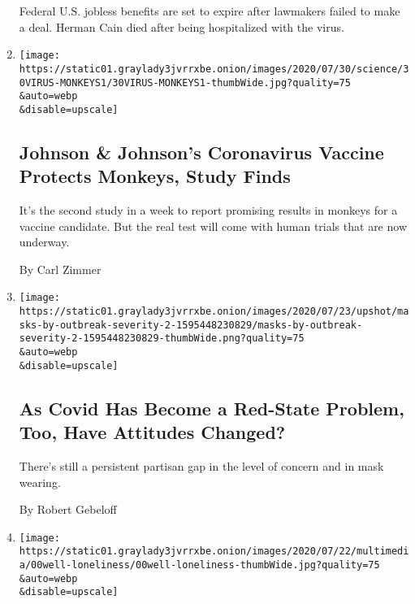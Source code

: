 \begin{enumerate}
  Federal U.S. jobless benefits are set to expire after lawmakers failed
  to make a deal. Herman Cain died after being hospitalized with the
  virus.
\item
  \href{/2020/07/30/health/covid-19-vaccine-monkeys.html}{}

  \texttt{[image: https://static01.graylady3jvrrxbe.onion/images/2020/07/30/science/30VIRUS-MONKEYS1/30VIRUS-MONKEYS1-thumbWide.jpg?quality=75\\\&auto=webp\\\&disable=upscale]}

  \hypertarget{johnson--johnsons-coronavirus-vaccine-protects-monkeys-study-finds}{%
  \subsection{Johnson \& Johnson's Coronavirus Vaccine Protects Monkeys,
  Study
  Finds}\label{johnson--johnsons-coronavirus-vaccine-protects-monkeys-study-finds}}

  It's the second study in a week to report promising results in monkeys
  for a vaccine candidate. But the real test will come with human trials
  that are now underway.

  By Carl Zimmer
\item
  \href{/2020/07/30/upshot/coronavirus-republican-voting.html}{}

  \texttt{[image: https://static01.graylady3jvrrxbe.onion/images/2020/07/23/upshot/masks-by-outbreak-severity-2-1595448230829/masks-by-outbreak-severity-2-1595448230829-thumbWide.png?quality=75\\\&auto=webp\\\&disable=upscale]}

  \hypertarget{as-covid-has-become-a-red-state-problem-too-have-attitudes-changed}{%
  \subsection{As Covid Has Become a Red-State Problem, Too, Have
  Attitudes
  Changed?}\label{as-covid-has-become-a-red-state-problem-too-have-attitudes-changed}}

  There's still a persistent partisan gap in the level of concern and in
  mask wearing.

  By Robert Gebeloff
\item
  \href{/2020/07/30/well/mind/pandemic-loneliness-in-late-life.html}{}

  \texttt{[image: https://static01.graylady3jvrrxbe.onion/images/2020/07/22/multimedia/00well-loneliness/00well-loneliness-thumbWide.jpg?quality=75\\\&auto=webp\\\&disable=upscale]}

  \hypertarget{living-with-cancer}{%
}
\end{enumerate}

